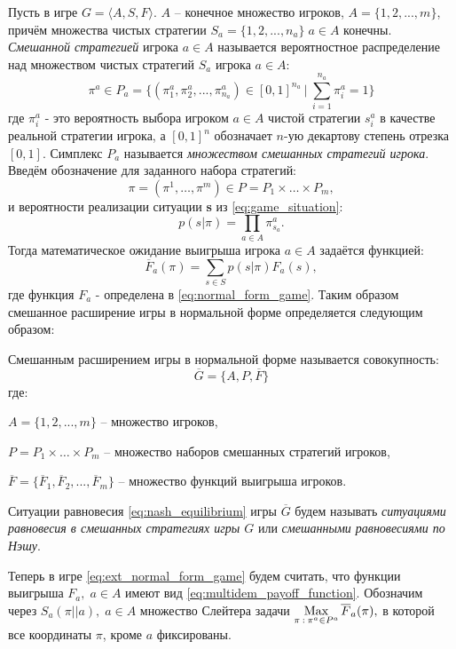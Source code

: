Пусть в игре 
$G = \big \langle A, S, F \big \rangle$. $A$ -- конечное множество игроков,
$A = \{1, 2, ..., m\}$, причём
множества чистых стратегии $S_a=\{1, 2,...,n_a\} \; a \in A$ конечны.  
\textit{Смешанной стратегией} игрока $a \in A$ называется 
вероятностное распределение над множеством чистых стратегий 
$S_a$ игрока $a \in A$:
$$
	\pi^a \in P_a
	= \{ 
		(\pi^a_1, \pi^a_2, ..., \pi^a_{n_a}) \in [0,1]^{n_a}\: | \:
		\sum \limits_{i=1}^{n_a} \pi^a_i = 1
	\}
$$
где $\pi^a_i$ - это вероятность выбора игроком $a \in A$ чистой 
стратегии $s^a_i$ в качестве реальной стратегии игрока,
а $[0,1]^n$ обозначает $n$-ую декартову степень отрезка $[0,1]$.
Симплекс $P_a$ называется \textit{множеством смешанных стратегий игрока}.
Введём обозначение для заданного набора стратегий:
$$
	\pi = (\pi^1, \ldots, \pi^m) \in P = P_1 \times \ldots \times P_m,
$$
и вероятности реализации ситуации \textbf{s} из 
\eqref{eq:game_situation}:
$$
	p(s|\pi) = \prod_{a \in A} \pi^a_{s_a}.
$$
Тогда математическое ожидание выигрыша игрока $a \in A$
задаётся функцией: 
$$
	\overline F_a(\pi) = \sum \limits_{s \in S}p(s|\pi)F_a(s),
$$
где функция $F_a$ - определена в \eqref{eq:normal_form_game}.
Таким образом смешанное расширение игры в нормальной форме определяется
следующим образом:

\begin{Defenition}
	Смешанным расширением игры в нормальной форме называется 
	совокупность:
	\begin{equation}
		\overline G = \lbrace A, P, \overline F \rbrace	
		\label{eq:ext_normal_form_game}
	\end{equation}
	где: 
 
	$A = \{1, 2, ..., m\}$ -- множество игроков,

	$P = P_1 \times \ldots \times P_m$ -- множество наборов смешанных 
	стратегий игроков,

	$\overline F = \{
		\overline F_1, \overline F_2, ..., \overline F_m
	\}$
	-- множество функций выигрыша игроков.
\end{Defenition}

Ситуации равновесия \eqref{eq:nash_equilibrium} игры $\overline G$
будем называть \textit{ситуациями равновесия в смешанных стратегиях игры $G$}
или \textit{смешанными равновесиями по Нэшу}. 

Теперь в игре \eqref{eq:ext_normal_form_game} будем считать, что функции
выигрыша $F_a, \; a \in A$ имеют вид \eqref{eq:multidem_payoff_function}.
Обозначим через $S_a(\pi || a), \; a \in A$ множество Слейтера задачи  
$
	\operatorname*{Max} \limits_{\pi \: : \: \pi^a \in P^a} \overline F_a(\pi), 
$
в которой все координаты $\pi$, кроме $a$ фиксированы.

